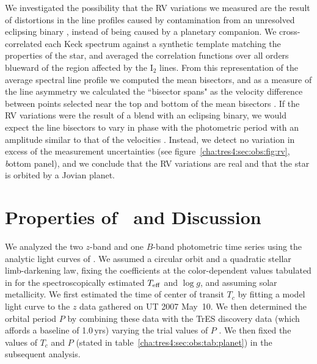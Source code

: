 We investigated the possibility that the RV variations we measured are the
result of distortions in the line profiles caused by contamination from an
unresolved eclipsing binary \citep{Santos_Mayor_Naef:aa:2002a, Torres_Konacki_Sasselov:apj:2005a}, instead of being caused by a planetary companion. We cross-correlated
each Keck spectrum against a synthetic template matching the properties of the
star, and averaged the correlation functions over all orders blueward of the
region affected by the I$_2$ lines. From this representation of the average
spectral line profile we computed the mean bisectors, and as a measure of the
line asymmetry we calculated the ``bisector spans" as the velocity difference
between points selected near the top and bottom of the mean bisectors
\citep{Torres_Konacki_Sasselov:apj:2005a}. If the RV variations were the result of a blend with an eclipsing
binary, we would expect the line bisectors to vary in phase with the
photometric period with an amplitude similar to that of the velocities
\citep{Queloz_Henry_Sivan:aa:2001a, Mandushev_Torres_Latham:apj:2005a}. Instead, we detect no variation in excess of the
measurement uncertainties (see figure~\ref{cha:tres4:sec:obs:fig:rv}, {\textit bottom panel}), and we conclude
that the RV variations are real and that the star is orbited by a Jovian
planet.

\section{Properties of \tresFour\ and Discussion}\label{cha:tres4:sec:dis}

We analyzed the two $z$-band and one $B$-band photometric time series using the
analytic light curves of \citet{Mandel_Agol:apjl:2002a}. We assumed a circular orbit and a
quadratic stellar limb-darkening law, fixing the coefficients at the
color-dependent values tabulated in \citet{Claret:aa:2000a, Claret:aa:2004a} for the
spectroscopically estimated $T_{\rm eff}$ and $\log g$, and assuming solar
metallicity. We first estimated the time of center of transit $T_c$ by fitting
a model light curve to the $z$ data gathered on UT 2007 May~10. We then determined the orbital period $P$ by combining these
data with the TrES discovery data (which affords a baseline of 1.0\,yrs)
varying the trial values of $P$
. We then fixed the values of $T_c$ and $P$
(stated in table~\ref{cha:tres4:sec:obs:tab:planet}) in the subsequent analysis.

